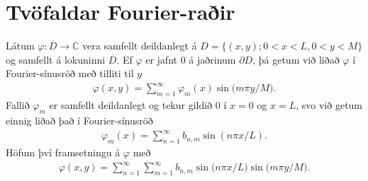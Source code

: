 \documentclass[a4paper,10pt,icelandic]{sphinxmanual}
\begin{document}
\section{Tvöfaldar Fourier-raðir}
\label{\detokenize{Kafli03:tvofaldar-fourier-rair}}
Látum \({\varphi}:\overline D\to {{\mathbb  C}}\) vera samfellt
deildanlegt á \(D=\{(x,y); 0<x<L, 0<y<M\}\) og samfellt á lokuninni
\(\overline  D\). Ef \({\varphi}\) er jafnt \(0\) á jaðrinum
\({\partial}D\), þá getum við liðað \({\varphi}\) í
Fourier-sínusröð með tilliti til \(y\)
\begin{equation*}
\begin{split}{\varphi}(x,y)= \sum\limits_{m=1}^{\infty}
 {\varphi}_m(x)\sin\big(m{\pi}y/M\big).\end{split}
\end{equation*}
Fallið \({\varphi}_m\) er samfellt deildanlegt og tekur gildið
\(0\) í \(x=0\) og \(x=L\), svo við getum einnig liðað það í
Fourier-sínusröð
\begin{equation*}
\begin{split}\varphi_m(x) = \sum_{n=1}^\infty b_{n,m} \sin(n\pi x/L).\end{split}
\end{equation*}
Höfum því framsetningu á \(\varphi\) með 
\begin{equation*}
\begin{split}{\varphi}(x,y)=\sum\limits_{n=1}^{{\infty}}
 \sum\limits_{m=1}^{{\infty}} b_{n,m}
 \sin\big(n{\pi}x/L\big)\sin\big(m{\pi}y/M\big).\end{split}
\end{equation*}
\end{document}
